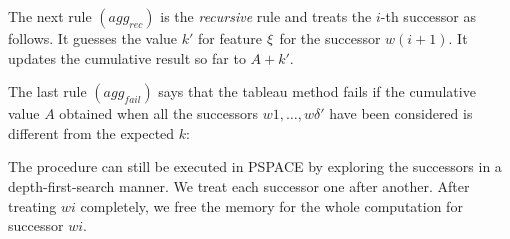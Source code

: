  


The next rule $(agg_{rec})$ is the \emph{recursive} rule and treats the $i$-th successor as follows. It guesses the value $k'$ for feature $\xi$ for the successor $w(i+1)$. It updates the cumulative result so far to $A+k'$.
	
	\begin{prooftree}\small
	\end{prooftree}

    
 The last rule $(agg_{fail})$ says that the tableau method fails if the cumulative value $A$ obtained when all the successors $w1, \dots, w\delta'$ have been considered is different from the expected $k$:
	
	
	\begin{prooftree}\small
	\end{prooftree}
	
	
	
	

	
	The procedure can still be executed in PSPACE by exploring the successors in a depth-first-search manner. We treat each successor one after another. After treating $wi$ completely, we free the memory for the whole computation for successor $wi$.















